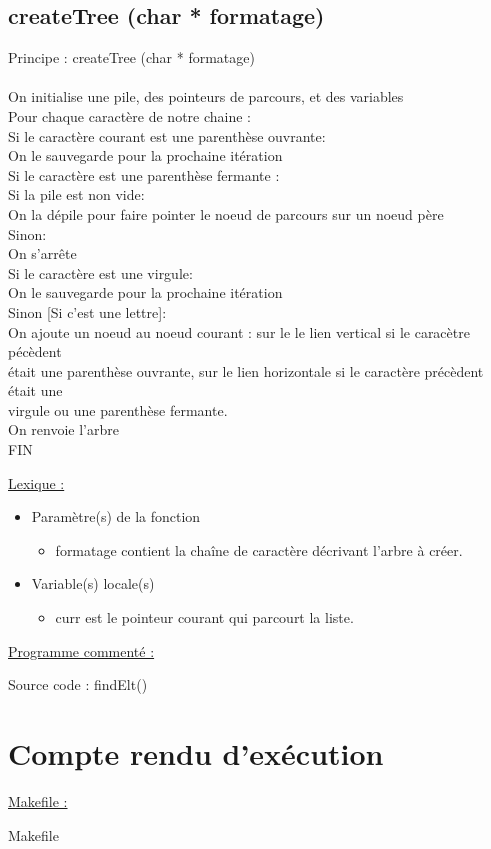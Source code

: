 \documentclass[a4paper]{article}
\newcommand\tab[1][1cm]{\hspace*{#1}}
\begin{document}
\subsection{createTree (char * formatage)}
\begin{algorithm}
Principe : createTree (char * formatage)
\\
\\
\tab On initialise une pile, des pointeurs de parcours, et des variables
\\
\tab Pour chaque caractère de notre chaine :
\\
\tab \tab Si le caractère courant est une parenthèse ouvrante:
\\
\tab \tab \tab On le sauvegarde pour la prochaine itération
\\
\tab \tab Si le caractère est une parenthèse fermante :
\\
\tab \tab \tab Si la pile est non vide:
\\
\tab \tab \tab \tab On la dépile pour faire pointer le noeud de parcours sur un noeud père
\\
\tab \tab \tab Sinon:
\\
\tab \tab \tab \tab On s'arrête
\\
\tab \tab Si le caractère est une virgule:
\\
\tab \tab \tab On le sauvegarde pour la prochaine itération
\\
\tab \tab Sinon [Si c'est une lettre]:
\\
\tab \tab \tab On ajoute un noeud au noeud courant : sur le le lien vertical si le caracètre pécèdent 
\\
\tab \tab \tab était une parenthèse ouvrante, sur le lien horizontale si le caractère précèdent était une
\\
\tab \tab \tab virgule ou une parenthèse fermante.
\\
\tab On renvoie l'arbre
\\
FIN
\end{algorithm}
\underline{Lexique :}
\begin{itemize}
\item Paramètre(s) de la fonction  
\begin{itemize}
\item formatage contient la chaîne de caractère décrivant l'arbre à créer.
\end{itemize}
\item Variable(s) locale(s)
\begin{itemize}
\item curr est le pointeur courant qui parcourt la liste.
\end{itemize}
\end{itemize}
\underline{Programme commenté :}
\begin{center}

Source code : findElt()
\end{center}


\section{Compte rendu d'exécution}

\underline{Makefile :}
\begin{center}

Makefile
\end{center}
\end{document}
